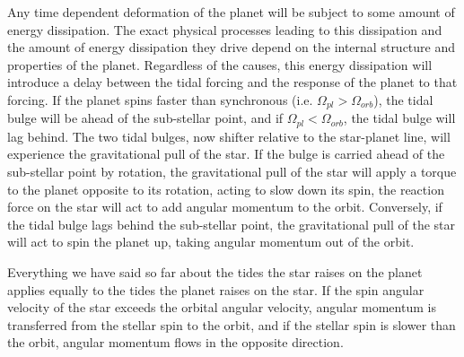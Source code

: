 Any time dependent deformation of the planet will be subject to some amount of
energy dissipation. The exact physical processes leading to this dissipation and
the amount of energy dissipation they drive depend on the internal structure and
properties of the planet. Regardless of the causes, this energy dissipation will
introduce a delay between the tidal forcing and the response of the planet to
that forcing. If the planet spins faster than synchronous (i.e. $\Omega_{pl} >
\Omega_{orb}$), the tidal bulge will be ahead of the sub-stellar point, and if
$\Omega_{pl} < \Omega_{orb}$, the tidal bulge will lag behind. The two tidal
bulges, now shifter relative to the star-planet line, will experience the
gravitational pull of the star. If the bulge is carried ahead of the sub-stellar
point by rotation, the gravitational pull of the star will apply a torque to
the planet opposite to its rotation, acting to slow down its spin, the reaction
force on the star will act to add angular momentum to the orbit. Conversely,
if the tidal bulge lags behind the sub-stellar point, the gravitational pull of
the star will act to spin the planet up, taking angular momentum out of the
orbit.

Everything we have said so far about the tides the star raises on the planet
applies equally to the tides the planet raises on the star. If the spin angular
velocity of the star exceeds the orbital angular velocity, angular momentum is
transferred from the stellar spin to the orbit, and if the stellar spin is
slower than the orbit, angular momentum flows in the opposite direction.
